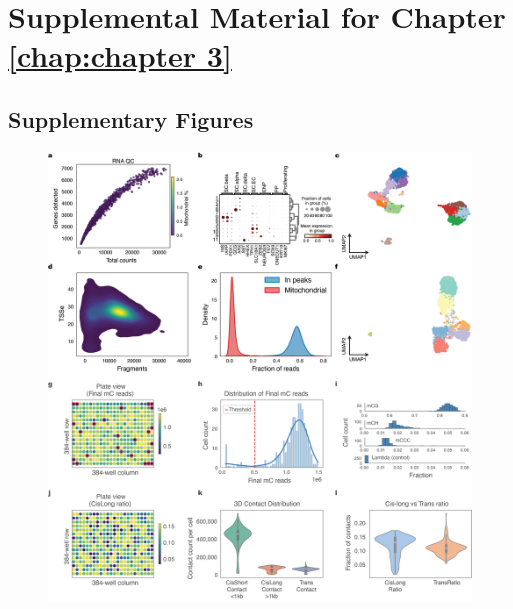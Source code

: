 \chapter{Supplemental Material for Chapter \ref{chap:chapter 3}}

\section{Supplementary Figures}

\begin{figure}[p]
    \centering
    \includegraphics[width=\textwidth]{3_figures-and-files/ExtendedFig1.png}

\end{figure}

